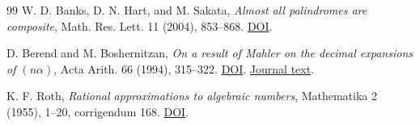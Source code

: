 \documentclass[11pt,reqno,a4paper]{amsart}
\theoremstyle{remark}
\begin{document}
\begin{thebibliography}{99}
W. D. Banks, D. N. Hart, and M. Sakata,
\emph{Almost all palindromes are composite},
Math. Res. Lett. 11 (2004), 853--868.
\href{https://doi.org/10.4310/MRL.2004.v11.n6.a10}{DOI}.

D. Berend and M. Boshernitzan,
\emph{On a result of Mahler on the decimal expansions of \((n\alpha)\)},
Acta Arith. 66 (1994), 315--322.
\href{https://doi.org/10.4064/aa-66-4-315-322}{DOI}.
\href{https://matwbn.icm.edu.pl/ksiazki/aa/aa66/aa6642.pdf}{Journal text}.

K. F. Roth, \emph{Rational approximations to algebraic numbers},
Mathematika 2 (1955), 1--20, corrigendum 168.
\href{https://doi.org/10.1112/S0025579300000644}{DOI}.


\end{thebibliography}
\end{document}
